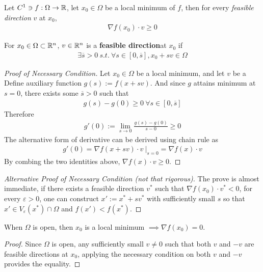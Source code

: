 \documentclass{article}
\begin{document}
   	\begin{theorem}
   		Let $C^1 \ni f: \Omega \to \mathbb{R}$, let $x_0 \in \Omega$ be a local minimum of $f$, then for every \emph{feasible direction} $v$ at $x_0$,
   		\begin{align}
   			\nabla f(x_0) \cdot v \geq 0
   		\end{align}
   	\end{theorem}
   	
   	\begin{definition}
   		For $x_0 \in \Omega \subset \mathbb{R}^n$,  $v \in \mathbb{R}^n$ is a \textbf{feasible direction}at $x_0$ if
   		\begin{align}
   			\exists \overline{s} > 0\ s.t.\ \forall s \in [0, \overline{s}], x_0 + s v \in \Omega
   		\end{align}
   	\end{definition}
   	
   	\begin{proof}[Proof of Necessary Condition]
   		Let $x_0 \in \Omega$ be a local minimum, and let $v$ be a 
   		Define auxiliary function $g(s) := f(x + sv)$. And since $g$ attains minimum at $s=0$, there exists some $\overline{s} > 0$ such that 
   		\begin{align}
   			g(s) - g(0) \geq 0\ \forall s \in [0, \overline{s}]
   		\end{align}
   		Therefore
   		\begin{align}
   			g'(0) := \lim_{s \to 0} \frac{g(s) - g(0)}{s - 0} \geq 0
   		\end{align}
   		The alternative form of derivative can be derived using chain rule as
   		\begin{align}
   			g'(0) = \nabla f(x + sv) \cdot v\ |_{s=0} = \nabla f(x) \cdot v
   		\end{align}
   		By combing the two identities above, $\nabla f(x) \cdot v \geq 0$.
   	\end{proof}
   	
   	\begin{proof}[Alternative Proof of Necessary Condition (not that rigorous)]
   		The prove is almost immediate, if there exists a feasible direction $v^*$ such that $\nabla f(x_0) \cdot v^* < 0$, for every $\varepsilon > 0$, one can construct $x' := x^* + s v^*$ with sufficiently small $s$ so that $x' \in V_\varepsilon(x^*) \cap  \Omega$ and $f(x') < f(x^*)$.
   	\end{proof}
   	
   	\begin{corollary}
   		When $\Omega$ is open, then $x_0$ is a local minimum $\implies \nabla f(x_0) = 0$.
   	\end{corollary}
   	\begin{proof}
   		Since $\Omega$ is open, any sufficiently small $v \neq 0$ such that both $v$ and $-v$ are feasible directions at $x_0$, applying the necessary condition on both $v$ and $-v$ provides the equality.
   	\end{proof}
   	
\end{document}
